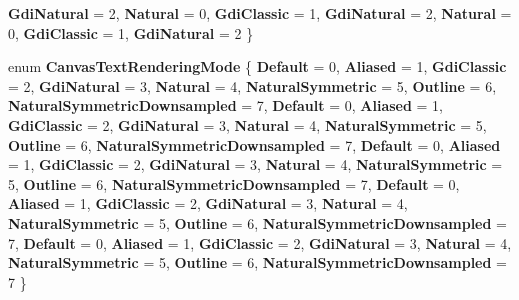 \begin{DoxyCompactItemize}
\newline
{\bfseries Gdi\+Natural} = 2, 
{\bfseries Natural} = 0, 
{\bfseries Gdi\+Classic} = 1, 
{\bfseries Gdi\+Natural} = 2, 
\newline
{\bfseries Natural} = 0, 
{\bfseries Gdi\+Classic} = 1, 
{\bfseries Gdi\+Natural} = 2
 \}
\item 
\mbox{\label{namespace_microsoft_1_1_graphics_1_1_canvas_1_1_text_a334e63f588579a4be3880313d6dabd2d}} 
enum {\bfseries Canvas\+Text\+Rendering\+Mode} \{ \newline
{\bfseries Default} = 0, 
{\bfseries Aliased} = 1, 
{\bfseries Gdi\+Classic} = 2, 
{\bfseries Gdi\+Natural} = 3, 
\newline
{\bfseries Natural} = 4, 
{\bfseries Natural\+Symmetric} = 5, 
{\bfseries Outline} = 6, 
{\bfseries Natural\+Symmetric\+Downsampled} = 7, 
\newline
{\bfseries Default} = 0, 
{\bfseries Aliased} = 1, 
{\bfseries Gdi\+Classic} = 2, 
{\bfseries Gdi\+Natural} = 3, 
\newline
{\bfseries Natural} = 4, 
{\bfseries Natural\+Symmetric} = 5, 
{\bfseries Outline} = 6, 
{\bfseries Natural\+Symmetric\+Downsampled} = 7, 
\newline
{\bfseries Default} = 0, 
{\bfseries Aliased} = 1, 
{\bfseries Gdi\+Classic} = 2, 
{\bfseries Gdi\+Natural} = 3, 
\newline
{\bfseries Natural} = 4, 
{\bfseries Natural\+Symmetric} = 5, 
{\bfseries Outline} = 6, 
{\bfseries Natural\+Symmetric\+Downsampled} = 7, 
\newline
{\bfseries Default} = 0, 
{\bfseries Aliased} = 1, 
{\bfseries Gdi\+Classic} = 2, 
{\bfseries Gdi\+Natural} = 3, 
\newline
{\bfseries Natural} = 4, 
{\bfseries Natural\+Symmetric} = 5, 
{\bfseries Outline} = 6, 
{\bfseries Natural\+Symmetric\+Downsampled} = 7, 
\newline
{\bfseries Default} = 0, 
{\bfseries Aliased} = 1, 
{\bfseries Gdi\+Classic} = 2, 
{\bfseries Gdi\+Natural} = 3, 
\newline
{\bfseries Natural} = 4, 
{\bfseries Natural\+Symmetric} = 5, 
{\bfseries Outline} = 6, 
{\bfseries Natural\+Symmetric\+Downsampled} = 7
 \}
\item 
\mbox{\label{namespace_microsoft_1_1_graphics_1_1_canvas_1_1_text_a7077d2f1ea9a72f9af3d69e5f5e04c20}} 

\end{DoxyCompactItemize}
